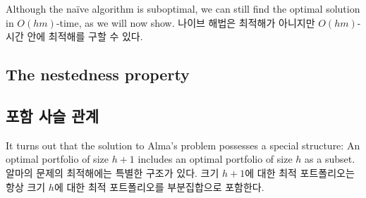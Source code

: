 \documentclass[11pt]{article} %
\newtheorem{corollary}{Corollary}
\theoremstyle{definition}
\newtheorem{corollary}{따름정리}
\theoremstyle{definition}
\begin{document}



\ifen
Although the na\"ive algorithm is suboptimal, we can still find the optimal solution in $O(hm)$-time, as we will now show.
\else
나이브 해법은 최적해가 아니지만 $O(hm)$-시간 안에 최적해를 구할 수 있다.
\fi

\ifen \subsection{The nestedness property}  \else \subsection{포함 사슬 관계} \fi
\ifen It turns out that the solution to Alma's problem possesses a special structure: An optimal portfolio of size $h+1$ includes an optimal portfolio of size $h$ as a subset.
\else 알마의 문제의 최적해에는 특별한 구조가 있다. 크기 $h+1$에 대한 최적 포트폴리오는 항상 크기 $h$에 대한 최적 포트폴리오를 부분집합으로 포함한다.\fi
\end{document}
